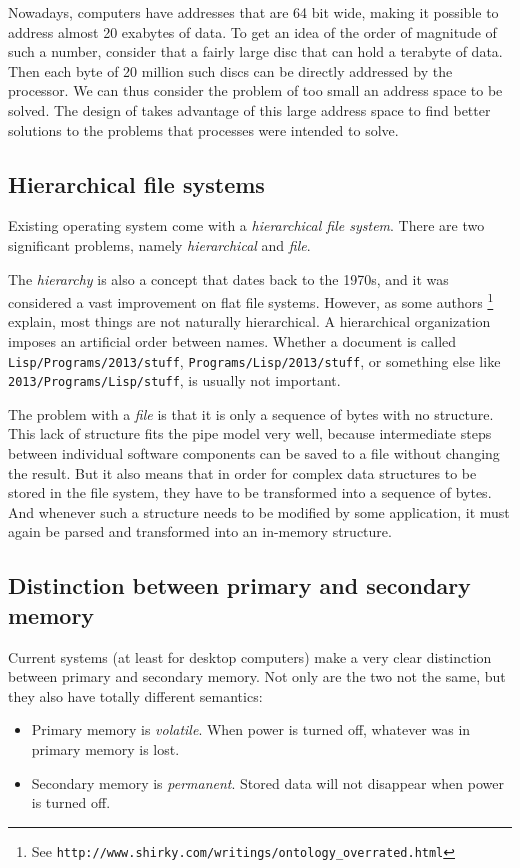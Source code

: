 Nowadays, computers have addresses that are 64 bit wide, making it
possible to address almost 20 exabytes of data.  To get an idea of the
order of magnitude of such a number, consider that a fairly large disc
that can hold a terabyte of data.  Then each byte of 20 million such
discs can be directly addressed by the processor.  We can thus
consider the problem of too small an address space to be solved.  The
design of \sysname{} takes advantage of this large address space to
find better solutions to the problems that processes were intended to
solve.

\subsection{Hierarchical file systems}

Existing operating system come with a \emph{hierarchical file
system}.  There are two significant problems,
namely \emph{hierarchical} and \emph{file}.

The \emph{ hierarchy} is also a concept that dates back to the
1970s, and it was considered a vast improvement on flat file
systems.  However, as some authors%
\footnote{See
  \texttt{http://www.shirky.com/writings/ontology\_overrated.html}}
explain, most things are not naturally hierarchical.  A hierarchical
organization imposes an artificial order between names.  Whether a
document is called \texttt{Lisp/Programs/2013/stuff},
\texttt{Programs/Lisp/2013/stuff}, or something else like
\texttt{2013/Programs/Lisp/stuff}, is usually not important.

The problem with a \emph{file} is that it is only a sequence of
bytes with no structure.  This lack of structure fits the \unix{} pipe
model very well, because intermediate steps between individual
software components can be saved to a file without changing the
result.  But it also means that in order for complex data structures
to be stored in the file system, they have to be transformed into a
sequence of bytes.  And whenever such a structure needs to be
modified by some application, it must again be parsed and
transformed into an in-memory structure.

\subsection{Distinction between primary and secondary memory}

Current systems (at least for desktop computers) make a very clear
distinction between primary and secondary memory.  Not only are the
two not the same, but they also have totally different semantics:
\begin{itemize}
\item Primary memory is \emph{volatile}.  When power is turned off,
    whatever was in primary memory is lost.
    \item Secondary memory is \emph{permanent}.  Stored data will not
    disappear when power is turned off.
\end{itemize}

